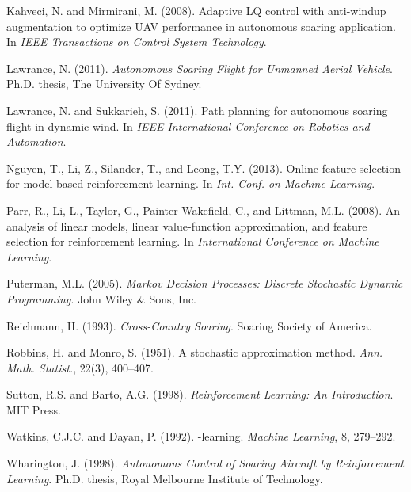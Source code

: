 \documentclass[a4paper, 10pt, conference]{ieeeconf}
\begin{document}
\begin{thebibliography}{99}
Kahveci, N. and Mirmirani, M. (2008).
\newblock Adaptive {LQ} control with anti-windup augmentation to optimize {UAV} performance in autonomous soaring application.
\newblock In \emph{IEEE Transactions on Control System Technology}.

Lawrance, N. (2011).
\newblock \emph{Autonomous Soaring Flight for Unmanned Aerial Vehicle}.
\newblock Ph.D. thesis, The University Of Sydney.

Lawrance, N. and Sukkarieh, S. (2011).
\newblock Path planning for autonomous soaring flight in dynamic wind.
\newblock In \emph{IEEE International Conference on Robotics and Automation}.

Nguyen, T., Li, Z., Silander, T., and Leong, T.Y. (2013).
\newblock Online feature selection for model-based reinforcement learning.
\newblock In \emph{Int. Conf. on Machine Learning}.

Parr, R., Li, L., Taylor, G., Painter-Wakefield, C., and Littman, M.L. (2008).
\newblock An analysis of linear models, linear value-function approximation, and feature selection for reinforcement learning.
\newblock In \emph{International Conference on Machine Learning}.

Puterman, M.L. (2005).
\newblock \emph{Markov Decision Processes: Discrete Stochastic Dynamic Programming}.
\newblock John Wiley \& Sons, Inc.

Reichmann, H. (1993).
\newblock \emph{Cross-Country Soaring}.
\newblock Soaring Society of America.

Robbins, H. and Monro, S. (1951).
\newblock A stochastic approximation method.
\newblock \emph{Ann. Math. Statist.}, 22(3), 400--407.

Sutton, R.S. and Barto, A.G. (1998).
\newblock \emph{Reinforcement Learning: An Introduction}.
\newblock MIT Press.

Watkins, C.J.C. and Dayan, P. (1992).
-learning.
\newblock \emph{Machine Learning}, 8, 279--292.

Wharington, J. (1998).
\newblock \emph{Autonomous Control of Soaring Aircraft by Reinforcement	Learning}.
\newblock Ph.D. thesis, Royal Melbourne Institute of Technology.

\end{thebibliography}
\end{document}
